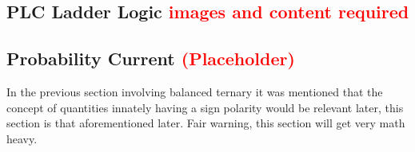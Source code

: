 \documentclass[a4paper]{article}
\begin{document}
\subsection{PLC Ladder Logic \textcolor{red}{images and content required}}
\label{PLC_Here}


\subsection{Probability Current\textcolor{red}{ (Placeholder)}} %
\label{ternaryRelevance} %


In the previous section involving balanced ternary it was mentioned that the concept of quantities innately having a sign polarity would be relevant later, this section is that aforementioned later. Fair warning, this section will get very math heavy. \newline
\newline


\label{FigureisThecommandYouAlwaysForget}%
\label{captionIsTheOtherOne}

\end{document}

